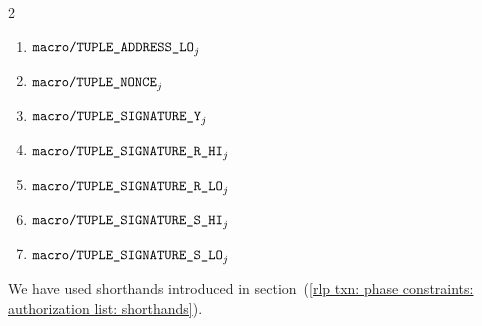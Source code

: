 \begin{description}
\begin{multicols}{2}
\begin{enumerate}
				\item $\rlpAuthMacroAddressLo        _{j}$
				\item $\rlpAuthMacroNonce            _{j}$
				\item $\rlpAuthMacroSignatureYparity _{j}$
				\item $\rlpAuthMacroSignatureRhi     _{j}$
				\item $\rlpAuthMacroSignatureRlo     _{j}$
				\item $\rlpAuthMacroSignatureShi     _{j}$
				\item $\rlpAuthMacroSignatureSlo     _{j}$
			\end{enumerate}
		\end{multicols}
\end{description}
\saNote{}
We have used shorthands introduced in section~(\ref{rlp txn: phase constraints: authorization list: shorthands}).
